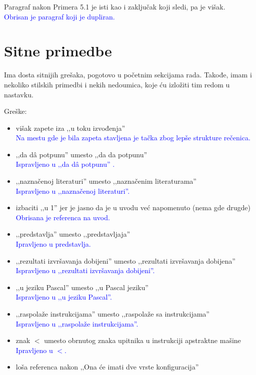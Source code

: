 \documentclass[a4paper]{report}
\newcommand{\odgovor}[1]{\textcolor{blue}{#1}}
\begin{document}
{Paragraf nakon Primera 5.1 je isti kao i zaključak koji sledi, pa je višak.} \\
\odgovor {Obrisan je paragraf koji je dupliran.}

\section{Sitne primedbe}

{Ima dosta sitnijih grešaka, pogotovo u početnim sekcijama rada. Takođe, imam i nekoliko stilskih primedbi i nekih nedoumica, koje ću izložiti tim redom u nastavku.}

Greške:
\begin{itemize}
	\item višak zapete iza ‚‚u toku izvođenja'' \\
	\odgovor{Na mestu gde je bila zapeta stavljena je tačka zbog lepše strukture rečenica.} 
	\item ‚‚da d\^{a} potpunu'' umesto ‚‚da da potpunu''\\
	\odgovor{Ispravljeno u ‚‚da d\^{a} potpunu'' .}
	\item ‚‚naznačenoj literaturi'' umesto ‚‚naznačenim literaturama''\\
	\odgovor{Ispravljeno u ‚‚naznačenoj literaturi''.}
	\item izbaciti ‚‚u 1'' jer je jasno da je u uvodu već napomenuto (nema gde drugde)\\
	\odgovor{Obrisana je referenca na uvod.}
	\item ‚‚predstavlja'' umesto ‚‚predstavljaja''\\
	\odgovor{Ipravljeno u predstavlja.}
	\item ‚‚rezultati izvršavanja dobijeni'' umesto ‚‚rezultati izvršavanja dobijena''\\
	 \odgovor{Ispravljeno u ‚‚rezultati izvršavanja dobijeni''. }
	\item ‚‚u jeziku Pascal'' umesto ‚‚u Pascal jeziku''\\
	\odgovor{Ispravljeno u ‚‚u jeziku Pascal''.}
	\item ‚‚raspolaže instrukcijama'' umesto ‚‚raspolaže sa instrukcijama''\\
	 \odgovor{Ispravljeno u ‚‚raspolaže instrukcijama''.}
	\item znak \textit{$<$} umesto obrnutog znaka upitnika u instrukciji apstraktne mašine\\
	\odgovor{Ipravljeno u \textit{$<$}.}
	\item loša referenca nakon ‚‚Ona će imati dve vrste konfiguracija''\\

\end{itemize}
\end{document}
